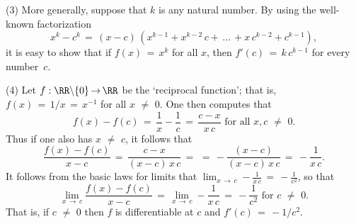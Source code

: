 \V

        (3) More generally, suppose that $k$ is any natural number. By using the well-known factorization
        \begin{displaymath}
        x^{k} - c^{k} \,=\, (x-c)\,(x^{k-1} + x^{k-2}\,c + \,{\ldots}\, + x\,c^{k-2} + c^{k-1}),
        \end{displaymath}
    it is easy to show that if $f(x) \,=\, x^{k}$ for all $x$, then $f'(c) \,=\, k\,c^{k-1}$ for every number~$c$.

\V

        (4) Let $f:{\RR}{\setminus}\{0\} \,{\rightarrow}\, {\RR}$ be the `reciprocal function';
    that is, $f(x) \,=\, 1/x \,=\, x^{-1}$ for all $x \,\,{\neq}\,\, 0$.
    One then computes that
        \begin{displaymath}
        f(x)-f(c) \,=\, \frac{1}{x} - \frac{1}{c} \,=\, \frac{c-x}{x\,c} \mbox{ for all $x, c \,\,{\neq}\,\, 0$}.
        \end{displaymath}
    Thus if one also has $x \,\,{\neq}\,\, c$, it follows that
        \begin{displaymath}
        \frac{f(x)-f(c)}{x-c} \,=\, \frac{c-x}{(x-c)\,x\,c} \,=\,
     \,=\, -\frac{(x-c)}{(x-c)\,x\,c} \,=\, -\frac{1}{x\,c}.
        \end{displaymath}
    It follows from the basic laws for limits that ${\displaystyle \lim_{x \,{\rightarrow}\, c} -\frac{1}{x\,c} \,=\, -\frac{1}{c^{2}}}$, so that
        \begin{displaymath}
        \lim_{x \,{\rightarrow}\, c} \frac{f(x)-f(c)}{x-c} \,=\, 
    \lim_{x \,{\rightarrow}\, c} -\frac{1}{x\,c} \,=\, -\frac{1}{c^{2}} \mbox{ for $c \,\,{\neq}\,\, 0$}.
        \end{displaymath}
    That is, if $c \,\,{\neq}\,\, 0$ then $f$ is differentiable at $c$ and $f'(c) \,=\, -1/c^{2}$.

\V


